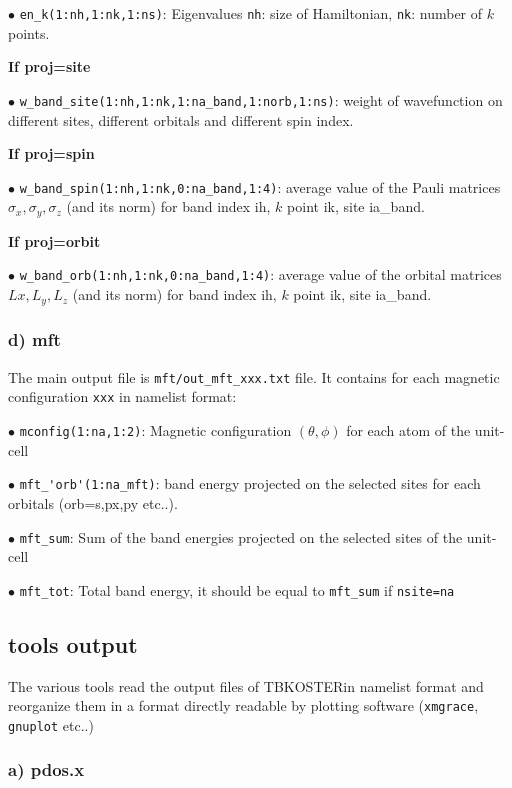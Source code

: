 \documentclass[12pt, onecolumn]{memoir}
\newcommand{\TBK}{\textcolor{nicered}{TBKOSTER}}
\begin{document}
$\bullet$ \verb+en_k(1:nh,1:nk,1:ns)+: Eigenvalues \verb+nh+: size of Hamiltonian, \verb+nk+: number of $k$ points.

\textbf{If proj=site}

$\bullet$  \verb+w_band_site(1:nh,1:nk,1:na_band,1:norb,1:ns)+: weight of wavefunction on different sites, different orbitals and different spin index.

\textbf{If proj=spin}

$\bullet$  \verb+w_band_spin(1:nh,1:nk,0:na_band,1:4)+: average value of the Pauli matrices $\sigma_x, \sigma_y, \sigma_z$ (and its norm) for band index ih, $k$ point ik, site ia\_band.

\textbf{If proj=orbit}

$\bullet$  \verb+w_band_orb(1:nh,1:nk,0:na_band,1:4)+: average value of the orbital matrices $Lx, L_y, L_z$ (and its norm) for band index ih, $k$ point ik, site ia\_band.

\subsubsection{d) mft}

\noindent
The main output file is \verb+mft/out_mft_xxx.txt+ file. It contains for each magnetic configuration \verb+xxx+ in namelist format:

$\bullet$ \verb+mconfig(1:na,1:2)+: Magnetic configuration $(\theta, \phi)$ for each atom of the unit-cell

$\bullet$  \verb+mft_'orb'(1:na_mft)+: band energy projected on the selected sites for each orbitals (orb=s,px,py etc..).

$\bullet$  \verb+mft_sum+: Sum of the band energies projected on the selected sites of the unit-cell

$\bullet$  \verb+mft_tot+: Total band energy, it should be equal to \verb+mft_sum+ if \verb+nsite=na+


\subsection{tools output}

\noindent
The various tools read the output files of \TBK  in namelist format and reorganize them in a format directly readable by plotting software (\verb+xmgrace+, \verb+gnuplot+ etc..)

\subsubsection{a) pdos.x}
\end{document}
